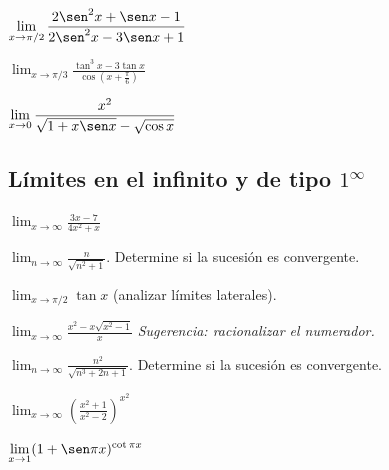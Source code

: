 \begin{prob}
$\displaystyle\lim_{x\to\pi/2}\frac{2\sen^2 x+\sen x-1}{2\sen^2 x-3\sen x+1}$
\end{prob}

\begin{prob}
$\displaystyle\lim_{x\to\pi/3}\frac{\tan^3 x-3\tan x}{\cos\!\left(x+\frac{\pi}{6}\right)}$
\end{prob}

\begin{prob}
$\displaystyle\lim_{x\to 0}\frac{x^2}{\sqrt{1+x\sen x}-\sqrt{\cos x}}$
\end{prob}

\subsection{Límites en el infinito y de tipo $1^\infty$}

\begin{prob}
$\displaystyle\lim_{x\to\infty}\frac{3x-7}{4x^2+x}$
\end{prob}

\begin{prob}
$\displaystyle\lim_{n\to\infty}\frac{n}{\sqrt{n^2+1}}$.
Determine si la sucesión es convergente.
\end{prob}

\begin{prob}
$\displaystyle\lim_{x\to\pi/2}\tan x$ \; (analizar límites laterales).
\end{prob}

\begin{prob}
$\displaystyle\lim_{x\to\infty}\frac{x^2-x\sqrt{x^2-1}}{x}$
\hfill\textit{Sugerencia: racionalizar el numerador.}
\end{prob}

\begin{prob}
$\displaystyle\lim_{n\to\infty}\frac{n^2}{\sqrt{n^3+2n+1}}$.
Determine si la sucesión es convergente.
\end{prob}

\begin{prob}
$\displaystyle\lim_{x\to\infty}\!\left(\frac{x^2+1}{x^2-2}\right)^{x^2}$
\end{prob}

\begin{prob}
$\displaystyle\lim_{x\to 1}(1+\sen\pi x)^{\cot\pi x}$
\end{prob}


